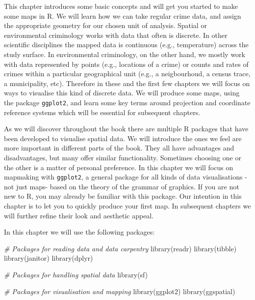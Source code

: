 \documentclass[
]{book}
\newenvironment{Shaded}{\begin{snugshade}}{\end{snugshade}}
\newcommand{\CommentTok}[1]{\textcolor[rgb]{0.56,0.35,0.01}{\textit{#1}}}
\newcommand{\FunctionTok}[1]{\textcolor[rgb]{0.00,0.00,0.00}{#1}}
\newcommand{\NormalTok}[1]{#1}
\begin{document}
This chapter introduces some basic concepts and will get you started to make some maps in R. We will learn how we can take regular crime data, and assign the appropriate geometry for our chosen unit of analysis. Spatial or environmental criminology works with data that often is discrete. In other scientific disciplines the mapped data is continuous (e.g., temperature) across the study surface. In environmental criminology, on the other hand, we mostly work with data represented by points (e.g., locations of a crime) or counts and rates of crimes within a particular geographical unit (e.g., a neigbourhoud, a census trace, a municipality, etc). Therefore in these and the first few chapters we will focus on ways to visualise this kind of discrete data. We will produce some maps, using the package \texttt{ggplot2}, and learn some key terms around projection and coordinate reference systems which will be essential for subsequent chapters.

As we will discover throughout the book there are multiple R packages that have been developed to visualise spatial data. We will introduce the ones we feel are more important in different parts of the book. They all have advantages and disadvantages, but many offer similar functionality. Sometimes choosing one or the other is a matter of personal preference. In this chapter we will focus on mapmaking with \texttt{ggplot2}, a general package for all kinds of data visualisations -not just maps- based on the theory of the grammar of graphics. If you are not new to R, you may already be familiar with this package. Our intention in this chapter is to let you to quickly produce your first map. In subsequent chapters we will further refine their look and aesthetic appeal.

In this chapter we will use the following packages:

\begin{Shaded}
\begin{Highlighting}[]
\CommentTok{\# Packages for reading data and data carpentry}
\FunctionTok{library}\NormalTok{(readr)}
\FunctionTok{library}\NormalTok{(tibble)}
\FunctionTok{library}\NormalTok{(janitor)}
\FunctionTok{library}\NormalTok{(dplyr)}

\CommentTok{\# Packages for handling spatial data}
\FunctionTok{library}\NormalTok{(sf)}

\CommentTok{\# Packages for visualisation and mapping}
\FunctionTok{library}\NormalTok{(ggplot2)}
\FunctionTok{library}\NormalTok{(ggspatial)}
\end{Highlighting}
\end{Shaded}
\end{document}
